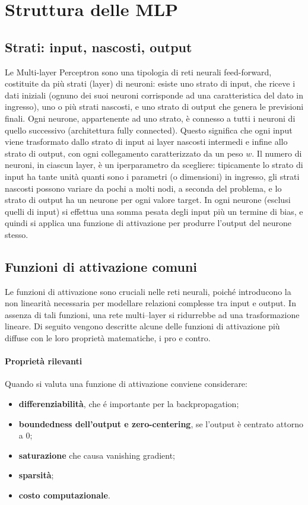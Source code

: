 \documentclass[a4paper,12pt]{report}
\begin{document}
	\section{Struttura delle MLP}
	
	\subsection{Strati: input, nascosti, output}
	Le Multi-layer Perceptron sono una tipologia di reti neurali feed-forward, costituite da più strati (layer) di neuroni: esiste uno strato di input, che riceve i dati iniziali (ognuno dei suoi neuroni corrisponde ad una caratteristica del dato in ingresso), uno o più strati nascosti, e uno strato di output che genera le previsioni finali. Ogni neurone, appartenente ad uno strato, è connesso a tutti i neuroni di quello successivo (architettura fully connected). Questo significa che ogni input viene trasformato dallo strato di input ai layer nascosti intermedi e infine allo strato di output, con ogni collegamento caratterizzato da un peso $w$. Il numero di neuroni, in ciascun layer, è un iperparametro da scegliere: tipicamente lo strato di input ha tante unità quanti sono i parametri (o dimensioni) in ingresso, gli strati nascosti possono variare da pochi a molti nodi, a seconda del problema, e lo strato di output ha un neurone per ogni valore target. In ogni neurone (esclusi quelli di input) si effettua una somma pesata degli input più un termine di bias, e quindi si applica una funzione di attivazione per produrre l’output del neurone stesso.
	
	\subsection{Funzioni di attivazione comuni}
	
	Le funzioni di attivazione sono cruciali nelle reti neurali, poiché introducono la non linearità necessaria per modellare relazioni complesse tra input e output. In assenza di tali funzioni, una rete multi–layer si ridurrebbe ad una trasformazione lineare. Di seguito vengono descritte alcune delle funzioni di attivazione più diffuse con le loro proprietà matematiche, i pro e contro.
	
	\paragraph{Proprietà rilevanti}
	Quando si valuta una funzione di attivazione conviene considerare:
	\begin{itemize}
		\item \textbf{differenziabilità}, che é importante per la backpropagation;
		\item \textbf{boundedness dell'output e zero-centering}, se l'output è centrato attorno a 0;
		\item \textbf{saturazione} che causa vanishing gradient;
		\item \textbf{sparsità};
		\item \textbf{costo computazionale}.
	\end{itemize}
	
\end{document}
